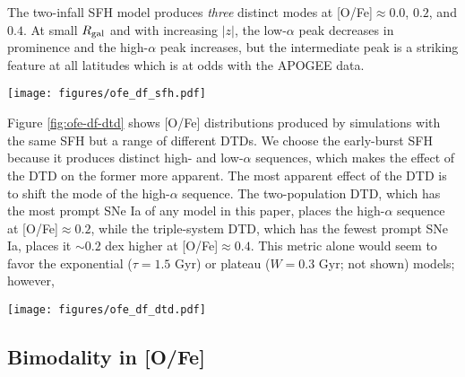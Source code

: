 \documentclass[twocolumn,twocolappendix,linenumbers,trackchanges]{aastex631}
\begin{document}
The two-infall SFH model produces \textit{three} distinct modes at [O/Fe]$\approx 0.0$, $0.2$, and $0.4$. At small $R_{\rm gal}$ and with increasing $|z|$, the low-$\alpha$ peak decreases in prominence and the high-$\alpha$ peak increases, but the intermediate peak is a striking feature at all latitudes which is at odds with the APOGEE data.


\begin{figure*}
    \centering
    \texttt{[image: figures/ofe\_df\_sfh.pdf]}
    \caption{Distributions of [O/Fe] from multi-zone simulations with different SFHs. In all cases an exponential DTD with timescale $\tau=1.5$ Gyr is assumed. The format of each panel is the same as in Figure \ref{fig:feh-df-comparison}, except that all distributions are smoothed with a box-car width of 0.05 dex. Distributions from APOGEE DR17, binned and smoothed similarly, are presented in the right-most column for reference.}
    \label{fig:ofe-df-sfh}
\end{figure*}

Figure \ref{fig:ofe-df-dtd} shows [O/Fe] distributions produced by simulations with the same SFH but a range of different DTDs. We choose the early-burst SFH because it produces distinct high- and low-$\alpha$ sequences, which makes the effect of the DTD on the former more apparent. The most apparent effect of the DTD is to shift the mode of the high-$\alpha$ sequence. The two-population DTD, which has the most prompt SNe Ia of any model in this paper, places the high-$\alpha$ sequence at [O/Fe]$\approx 0.2$, while the triple-system DTD, which has the fewest prompt SNe Ia, places it $\sim0.2$ dex higher at [O/Fe]$\approx0.4$. This metric alone would seem to favor the exponential ($\tau=1.5$ Gyr) or plateau ($W=0.3$ Gyr; not shown) models; however, 

\begin{figure*}
    \centering
    \texttt{[image: figures/ofe\_df\_dtd.pdf]}
    \caption{Distributions of [O/Fe] from multi-zone simulations with different DTDs. In all cases an early-burst SFH is assumed. The plot format is similar to Figure \ref{fig:ofe-df-sfh}.}
    \label{fig:ofe-df-dtd}
\end{figure*}

\subsection{Bimodality in [O/Fe]}
\label{sec:bimodality}
\end{document}
